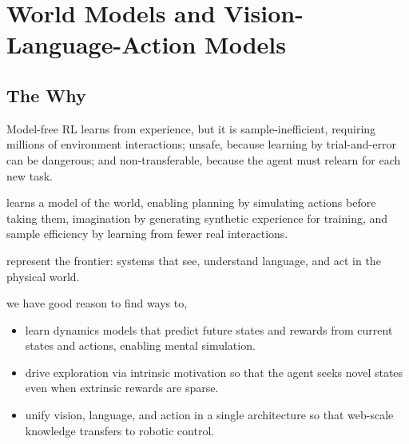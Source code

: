 
\chapter{World Models and Vision-Language-Action Models}


\section{The Why}


Model-free RL learns from experience, but it is sample-inefficient, requiring millions of environment interactions; unsafe, because learning by trial-and-error can be dangerous; and non-transferable, because the agent must relearn for each new task.

 learns a model of the world, enabling planning by simulating actions before taking them, imagination by generating synthetic experience for training, and sample efficiency by learning from fewer real interactions.

 represent the frontier: systems that see, understand language, and act in the physical world.

 we have good reason to find ways to,
\begin{itemize}
    \item learn dynamics models that predict future states and rewards from current states and actions, enabling mental simulation.
    \item drive exploration via intrinsic motivation so that the agent seeks novel states even when extrinsic rewards are sparse.
    \item unify vision, language, and action in a single architecture so that web-scale knowledge transfers to robotic control.
\end{itemize}


